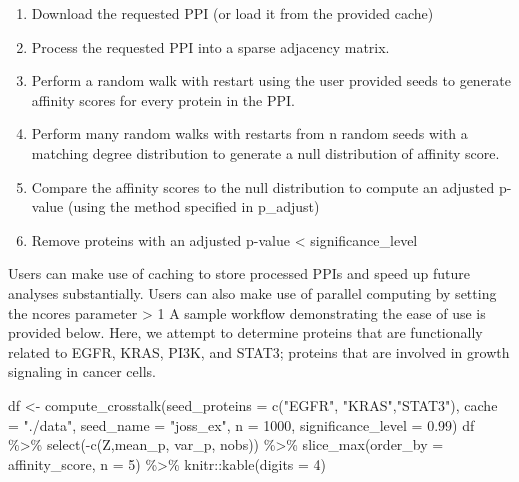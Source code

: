 \documentclass{article}
\newenvironment{Shaded}{\begin{snugshade}}{\end{snugshade}}
\newcommand{\AttributeTok}[1]{\textcolor[rgb]{0.77,0.63,0.00}{#1}}
\newcommand{\DecValTok}[1]{\textcolor[rgb]{0.00,0.00,0.81}{#1}}
\newcommand{\FloatTok}[1]{\textcolor[rgb]{0.00,0.00,0.81}{#1}}
\newcommand{\FunctionTok}[1]{\textcolor[rgb]{0.00,0.00,0.00}{#1}}
\newcommand{\NormalTok}[1]{#1}
\newcommand{\OtherTok}[1]{\textcolor[rgb]{0.56,0.35,0.01}{#1}}
\newcommand{\SpecialCharTok}[1]{\textcolor[rgb]{0.00,0.00,0.00}{#1}}
\newcommand{\StringTok}[1]{\textcolor[rgb]{0.31,0.60,0.02}{#1}}
\providecommand{\tightlist}{%
  \setlength{\itemsep}{0pt}\setlength{\parskip}{0pt}}
\begin{document}
\begin{enumerate}
\def\labelenumi{\arabic{enumi}.}
\tightlist
\item
  Download the requested PPI (or load it from the provided cache)
\item
  Process the requested PPI into a sparse adjacency matrix.
\item
  Perform a random walk with restart using the user provided seeds to
  generate affinity scores for every protein in the PPI.
\item
  Perform many random walks with restarts from n random seeds with a
  matching degree distribution to generate a null distribution of
  affinity score.
\item
  Compare the affinity scores to the null distribution to compute an
  adjusted p-value (using the method specified in p\_adjust)
\item
  Remove proteins with an adjusted p-value \textless{}
  significance\_level
\end{enumerate}

Users can make use of caching to store processed PPIs and speed up
future analyses substantially. Users can also make use of parallel
computing by setting the ncores parameter \textgreater{} 1 A sample
workflow demonstrating the ease of use is provided below. Here, we
attempt to determine proteins that are functionally related to EGFR,
KRAS, PI3K, and STAT3; proteins that are involved in growth signaling in
cancer cells.

\begin{Shaded}
\begin{Highlighting}[]
\NormalTok{df }\OtherTok{\textless{}{-}} \FunctionTok{compute\_crosstalk}\NormalTok{(}\AttributeTok{seed\_proteins =} \FunctionTok{c}\NormalTok{(}\StringTok{"EGFR"}\NormalTok{, }\StringTok{"KRAS"}\NormalTok{,}\StringTok{"STAT3"}\NormalTok{), }
                        \AttributeTok{cache =} \StringTok{"./data"}\NormalTok{, }\AttributeTok{seed\_name =} \StringTok{"joss\_ex"}\NormalTok{, }\AttributeTok{n =} \DecValTok{1000}\NormalTok{, }
                        \AttributeTok{significance\_level =} \FloatTok{0.99}\NormalTok{)}
\NormalTok{df }\SpecialCharTok{\%\textgreater{}\%}
  \FunctionTok{select}\NormalTok{(}\SpecialCharTok{{-}}\FunctionTok{c}\NormalTok{(Z,mean\_p, var\_p, nobs)) }\SpecialCharTok{\%\textgreater{}\%}
  \FunctionTok{slice\_max}\NormalTok{(}\AttributeTok{order\_by =}\NormalTok{ affinity\_score, }\AttributeTok{n =} \DecValTok{5}\NormalTok{) }\SpecialCharTok{\%\textgreater{}\%} 
\NormalTok{  knitr}\SpecialCharTok{::}\FunctionTok{kable}\NormalTok{(}\AttributeTok{digits =} \DecValTok{4}\NormalTok{)}
\end{Highlighting}
\end{Shaded}
\end{document}
